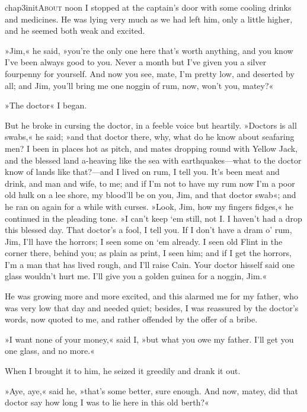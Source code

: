 
   \lettrine[lines=4,image=true]{chap3initA}{bout} noon I stopped at the captain's door with some cooling drinks and medicines. He was lying very much as we had left him, only a little higher, and he seemed both weak and excited.

»Jim,« he said, »you're the only one here that's worth anything, and you know I've been always good to you. Never a month but I've given you a silver fourpenny for yourself. And now you see, mate, I'm pretty low, and deserted by all; and Jim, you'll bring me one noggin of rum, now, won't you, matey?«

»The doctor\longdash« I began.

But he broke in cursing the doctor, in a feeble voice but heartily. »Doctors is all swabs,« he said; »and that doctor there, why, what do he know about seafaring men? I been in places hot as pitch, and mates dropping round with Yellow Jack, and the blessed land a-heaving like the sea with earthquakes—what to the doctor know of lands like that?—and I lived on rum, I tell you. It's been meat and drink, and man and wife, to me; and if I'm not to have my rum now I'm a poor old hulk on a lee shore, my blood'll be on you, Jim, and that doctor swab«; and he ran on again for a while with curses. »Look, Jim, how my fingers fidges,« he continued in the pleading tone. »I can't keep `em still, not I. I haven't had a drop this blessed day. That doctor's a fool, I tell you. If I don't have a dram o' rum, Jim, I'll have the horrors; I seen some on `em already. I seen old Flint in the corner there, behind you; as plain as print, I seen him; and if I get the horrors, I'm a man that has lived rough, and I'll raise Cain. Your doctor hisself said one glass wouldn't hurt me. I'll give you a golden guinea for a noggin, Jim.«

He was growing more and more excited, and this alarmed me for my father, who was very low that day and needed quiet; besides, I was reassured by the doctor's words, now quoted to me, and rather offended by the offer of a bribe.

»I want none of your money,« said I, »but what you owe my father. I'll get you one glass, and no more.«

When I brought it to him, he seized it greedily and drank it out.

»Aye, aye,« said he, »that's some better, sure enough. And now, matey, did that doctor say how long I was to lie here in this old berth?«

